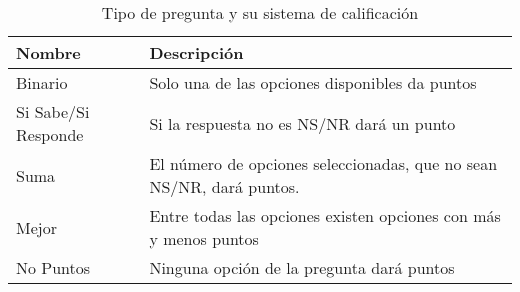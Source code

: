 
\begin{table}[H]
    \centering
    \begin{tabular}{p{5cm} | p{8cm}}
        \textbf{Nombre} & \textbf{Descripción}\\
        \hline\hline
        Binario & Solo una de las opciones disponibles da puntos \\
        \hline
        Si Sabe/Si Responde & Si la respuesta no es NS/NR dará un punto\\
        \hline
        Suma & El número de opciones seleccionadas, que no sean NS/NR, dará puntos.\\
        \hline
        Mejor & Entre todas las opciones existen opciones con más y menos puntos\\
        \hline
        No Puntos & Ninguna opción de la pregunta dará puntos\\
        \hline
    \end{tabular}
    \caption{Tipo de pregunta y su sistema de calificación}
    \label{tab:pregunta-calificacion}
\end{table}